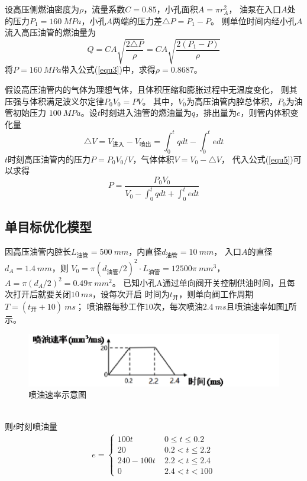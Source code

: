 \documentclass[withoutpreface,bwprint]{cumcmthesis} %
\begin{document}
    
    设高压侧燃油密度为$\rho$，流量系数$C=0.85$，小孔面积$A=\pi r_{A}^2$，
    油泵在入口$A$处的压力$P_1=160~MPa$，小孔$A$两端的压力差$\triangle P=P_1-P$。
    则单位时间内经小孔$A$流入高压油管的燃油量为
    \begin{equation}
        Q=CA\sqrt{\frac{2\triangle P}{\rho}}=CA\sqrt{\frac{2(P_1-P)}{\rho}}
    \label{equ4}
    \end{equation}    
    将$P=160~MPa$带入公式(\ref{equ3})中，求得$\rho=0.8687$。

    假设高压油管内的气体为理想气体，且体积压缩和膨胀过程中无温度变化，
    则其压强与体积满足波义尔定律$P_0V_0=PV$。
    其中，$V_0$为高压油管内腔总体积，$P_0$为油管初始压力
    $100~MPa$。设$t$时刻进入油管的燃油量为$q$，排出量为$e$，则管内体积变化量
    \begin{equation}
        \triangle V=V_{\text{进入}}-V_{\text{喷出}}=\int_0^t q dt-\int_0^t e dt
    \label{equ5}
    \end{equation}
    $t$时刻高压油管内的压力$P=P_0V_0 / V$，气体体积$V=V_0-\triangle V$，
    代入公式(\ref{equ5})可以求得
    \begin{equation}
        P=\frac{P_0V_0}{V_0-\int_0^t q dt+\int_0^t e dt}
    \label{equ6}
    \end{equation}

\subsection{单目标优化模型}
    因高压油管内腔长$L_{\text{油管}}=500~mm$，内直径$d_{\text{油管}}=10~mm$，
    入口$A$的直径$d_A=1.4~mm$，则
    $V_0=\pi (d_{\text{油管}}/2)^2\cdot L_{\text{油管}}=12500\pi ~mm^3$，
    $A=\pi (d_A/2)^2=0.49\pi ~mm^2$。
    已知小孔A通过单向阀开关控制供油时间，且每次打开后就要关闭$10~ms$，设每次开启
    时间为$t_{\text{开}}$，则单向阀工作周期$T=(t_{\text{开}} + 10)~ms$；
    喷油器每秒工作10次，每次喷油$2.4~ms$且喷油速率如图\ref{figure2}所示。
    \begin{figure}[htbp]
        \centering
        \includegraphics[width=.7\textwidth]{E_rate.png}
        \caption{喷油速率示意图}
        \label{figure2}
    \end{figure} \\
    则$t$时刻喷油量
    \begin{eqnarray}
    e=
    \begin{cases}
        100t \quad \quad \quad & 0 \leq t \leq 0.2 \\
        20   & 0.2 < t \leq 2.2 \\
        240-100t  & 2.2 < t \leq 2.4 \\
        0 & 2.4 < t <100
    \end{cases}
    \label{equ7}
    \end{eqnarray}
\end{document}
